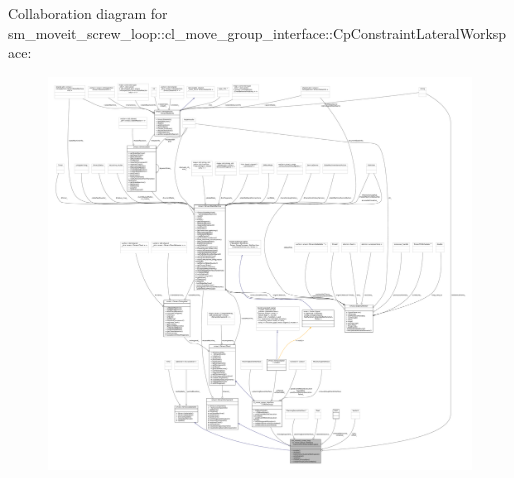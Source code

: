 Collaboration diagram for sm\+\_\+moveit\+\_\+screw\+\_\+loop\+:\+:cl\+\_\+move\+\_\+group\+\_\+interface\+:\+:Cp\+Constraint\+Lateral\+Workspace\+:
\nopagebreak
\begin{figure}[H]
\begin{center}
\leavevmode
\includegraphics[width=350pt]{classsm__moveit__screw__loop_1_1cl__move__group__interface_1_1CpConstraintLateralWorkspace__coll__graph}
\end{center}
\end{figure}

